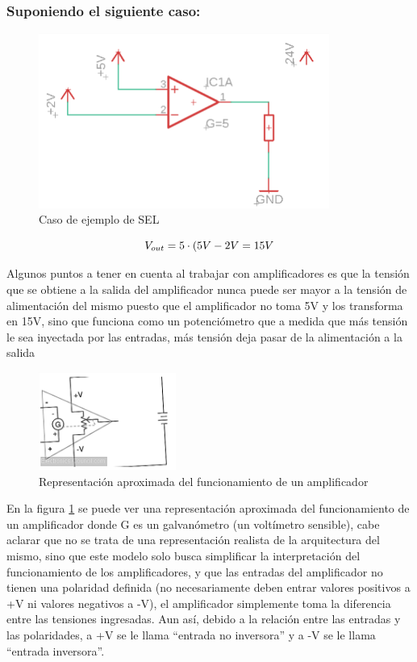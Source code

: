 \documentclass[../main.tex]{subfiles}
\begin{document}
		\subsubsection*{Suponiendo el siguiente caso:}
		\begin{figure}[H]
			\includegraphics[width=0.85\textwidth]{imagen17.png}
			\centering
			\caption{Caso de ejemplo de SEL}
		\end{figure}
		\[
		V_{out} = 5 \cdot (5V - 2V = 15V
		\]

	Algunos puntos a tener en cuenta al trabajar con amplificadores es que la tensión 
	que se obtiene a la salida del amplificador nunca puede ser mayor a la tensión de 
	alimentación del mismo puesto que el amplificador no toma 5V y los transforma en 
	15V, sino que funciona como un potenciómetro que a medida que más tensión le sea 
	inyectada por las entradas, más tensión deja pasar de la alimentación a la salida

	\begin{figure}[H]
		\includegraphics[width=0.4\textwidth]{imagen18.png}
		\centering
		\caption{Representación aproximada del funcionamiento de un amplificador}
		\label{fig:18}
	\end{figure}
	En la figura \ref{fig:18} se puede ver una representación aproximada del funcionamiento 
	de un amplificador donde G es un galvanómetro (un voltímetro sensible), cabe 
	aclarar que no se trata de una representación realista de la arquitectura 
	del mismo, sino que este modelo solo busca simplificar la interpretación del 
	funcionamiento de los amplificadores, y que las entradas del amplificador no 
	tienen una polaridad definida (no necesariamente deben entrar valores positivos 
	a +V ni valores negativos a -V), el amplificador simplemente toma la diferencia 
	entre las tensiones ingresadas. Aun así, debido a la relación entre las 
	entradas y las polaridades, a +V se le llama ``entrada no inversora'' y a -V se 
	le llama ``entrada inversora''.
\end{document}
